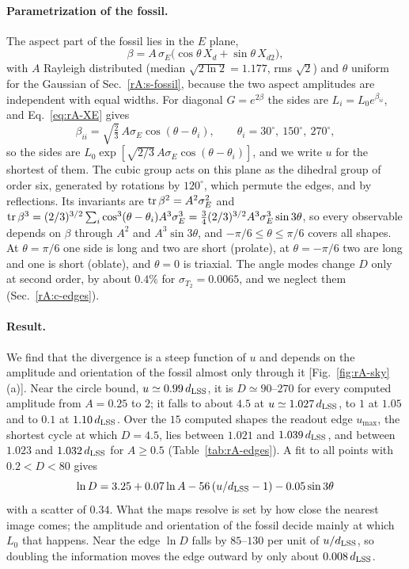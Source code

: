 \paragraph{Parametrization of the fossil.}
The aspect part of the fossil lies in the $E$ plane,
\begin{equation}
\beta=A\,\sigma_E\big(\cos\theta\,X_d+\sin\theta\,X_{d2}\big),
\label{eq:rA-Eplane}
\end{equation}
with $A$ Rayleigh distributed (median $\sqrt{2\ln2}=1.177$, rms $\sqrt2$) and $\theta$ uniform for the Gaussian of Sec.~\ref{rA:s-fossil}, because the two aspect amplitudes are independent with equal widths. %
For diagonal $G=e^{2\beta}$ the sides are $L_i=L_0e^{\beta_{ii}}$, and Eq.~\eqref{eq:rA-XE} gives
\begin{equation}
\beta_{ii}=\sqrt{\tfrac23}\,A\sigma_E\cos(\theta-\theta_i),\qquad \theta_i=30^\circ,\ 150^\circ,\ 270^\circ,
\end{equation}
so the sides are $L_0\exp[\sqrt{2/3}\,A\sigma_E\cos(\theta-\theta_i)]$, and we write $u$ for the shortest of them.
The cubic group acts on this plane as the dihedral group of order six, generated by rotations by $120^\circ$, which permute the edges, and by reflections.
Its invariants are $\operatorname{tr}\beta^2=A^2\sigma_E^2$ and $\operatorname{tr}\beta^3=(2/3)^{3/2}\sum_i\cos^3(\theta-\theta_i)A^3\sigma_E^3=\tfrac34(2/3)^{3/2}A^3\sigma_E^3\sin3\theta$, so every observable depends on $\beta$ through $A^2$ and $A^3\sin3\theta$, and $-\pi/6\leq\theta\leq\pi/6$ covers all shapes.
At $\theta=\pi/6$ one side is long and two are short (prolate), at $\theta=-\pi/6$ two are long and one is short (oblate), and $\theta=0$ is triaxial.
The angle modes change $D$ only at second order, by about $0.4\%$ for $\sigma_{T_2}=0.0065$, and we neglect them (Sec.~\ref{rA:c-edges}). %

\paragraph{Result.}
We find that the divergence is a steep function of $u$ and depends on the amplitude and orientation of the fossil almost only through it [Fig.~\ref{fig:rA-sky}(a)].
Near the circle bound, $u\simeq0.99\,d_{\mathrm{LSS}}$, it is $D\simeq90$--$270$ for every computed amplitude from $A=0.25$ to $2$; it falls to about $4.5$ at $u\simeq1.027\,d_{\mathrm{LSS}}$, to $1$ at $1.05$ and to $0.1$ at $1.10\,d_{\mathrm{LSS}}$. %
Over the $15$ computed shapes the readout edge $u_{\max}$, the shortest cycle at which $D=4.5$, lies between $1.021$ and $1.039\,d_{\mathrm{LSS}}$, and between $1.023$ and $1.032\,d_{\mathrm{LSS}}$ for $A\geq0.5$ (Table~\ref{tab:rA-edges}). %
A fit to all points with $0.2<D<80$ gives
\begin{equation}
\ln D=3.25+0.07\ln A-56\,(u/d_{\mathrm{LSS}}-1)-0.05\sin3\theta
\end{equation}
with a scatter of $0.34$. %
What the maps resolve is set by how close the nearest image comes; the amplitude and orientation of the fossil decide mainly at which $L_0$ that happens.
Near the edge $\ln D$ falls by $85$--$130$ per unit of $u/d_{\mathrm{LSS}}$, so doubling the information moves the edge outward by only about $0.008\,d_{\mathrm{LSS}}$. %

